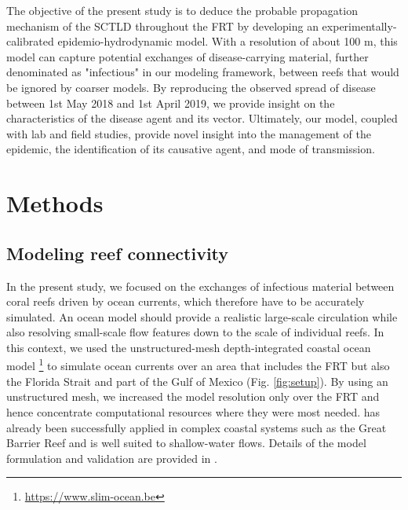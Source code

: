 The objective of the present study is to deduce the probable propagation mechanism of the SCTLD throughout the FRT by developing an experimentally-calibrated epidemio-hydrodynamic model. With a resolution of about 100 m, this model can capture potential exchanges of disease-carrying material, further denominated as "infectious" in our modeling framework, between reefs that would be ignored by coarser models. By reproducing the observed spread of disease between 1st May 2018 and 1st April 2019, we provide insight on the characteristics of the disease agent and its vector. Ultimately, our model, coupled with lab and field studies, provide novel insight into the management of the epidemic, the identification of its causative agent, and mode of transmission.

\section{Methods}

\subsection{Modeling reef connectivity}
In the present study, we focused on the exchanges of infectious material between coral reefs driven by ocean currents, which therefore have to be accurately simulated. An ocean model should provide a realistic large-scale circulation while also resolving small-scale flow features down to the scale of individual reefs. In this context, we used the unstructured-mesh depth-integrated coastal ocean model \slim\footnote{\url{https://www.slim-ocean.be}} to simulate ocean currents over an area that includes the FRT but also the Florida Strait and part of the Gulf of Mexico (Fig. \ref{fig:setup}). By using an unstructured mesh, we increased the model resolution only over the FRT and hence concentrate computational resources where they were most needed. \slim has already been successfully applied in complex coastal systems such as the Great Barrier Reef \citep{lambrechts2008multi, thomas2014numerical} and is well suited to shallow-water flows. Details of the model formulation and validation are provided in \cite{frys2020fine}. 

